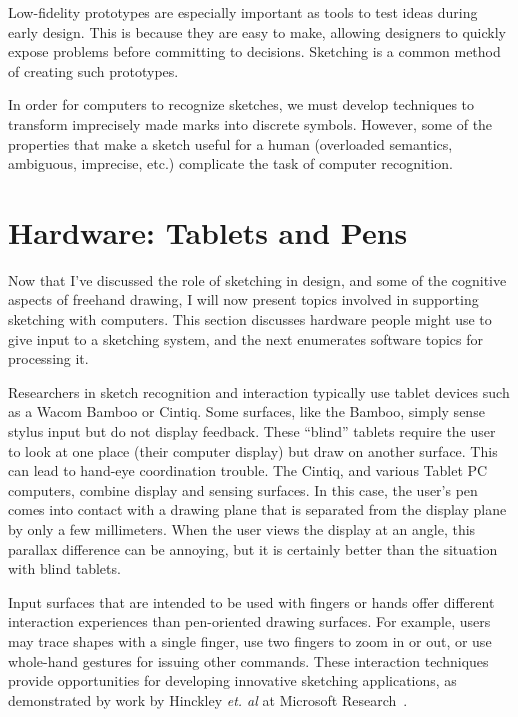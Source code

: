 Low-fidelity prototypes are especially important as tools to test
ideas during early design. This is because they are easy to make,
allowing designers to quickly expose problems before committing to
decisions. Sketching is a common method of creating such prototypes.

In order for computers to recognize sketches, we must develop
techniques to transform imprecisely made marks into discrete
symbols. However, some of the properties that make a sketch useful for
a human (overloaded semantics, ambiguous, imprecise, etc.) complicate
the task of computer recognition.


\section{Hardware: Tablets and Pens}

Now that I've discussed the role of sketching in design, and some of
the cognitive aspects of freehand drawing, I will now present topics
involved in supporting sketching with computers. This section
discusses hardware people might use to give input to a sketching
system, and the next enumerates software topics for processing it.

Researchers in sketch recognition and interaction typically use tablet
devices such as a Wacom Bamboo or Cintiq. Some surfaces, like the
Bamboo, simply sense stylus input but do not display feedback. These
``blind'' tablets require the user to look at one place (their
computer display) but draw on another surface. This can lead to
hand-eye coordination trouble. The Cintiq, and various Tablet PC
computers, combine display and sensing surfaces. In this case, the
user's pen comes into contact with a drawing plane that is separated
from the display plane by only a few millimeters. When the user views
the display at an angle, this parallax difference can be annoying, but
it is certainly better than the situation with blind tablets.

Input surfaces that are intended to be used with fingers or hands
offer different interaction experiences than pen-oriented drawing
surfaces. For example, users may trace shapes with a single finger,
use two fingers to zoom in or out, or use whole-hand gestures for
issuing other commands. These interaction techniques provide
opportunities for developing innovative sketching applications, as
demonstrated by work by Hinckley \textit{et. al} at Microsoft
Research~\cite{hinckley-pen-touch}.

